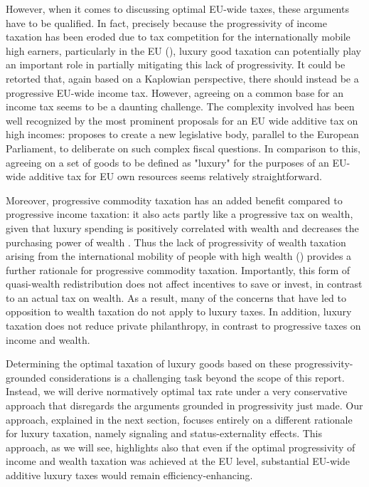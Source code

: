 \documentclass[../../main]{subfiles}
\begin{document}
However, when it comes to discussing optimal EU-wide taxes, these arguments have to be qualified. In fact, precisely because the progressivity of income taxation has been eroded due to tax competition for the internationally mobile high earners, particularly in the EU (\citet{kleven2011taxation}), luxury good taxation can potentially play an important role in partially mitigating this lack of progressivity. It could be retorted that, again based on a Kaplowian perspective, there should instead be a progressive EU-wide income tax. However, agreeing on a common base for an income tax seems to be a daunting challenge. The complexity involved has been well recognized by the most prominent proposals for an EU wide additive tax on high incomes: \citet{hennette2019democratize} proposes to create a new legislative body, parallel to the European Parliament, to deliberate on such complex fiscal questions. In comparison to this, agreeing on a set of goods to be defined as "luxury" for the purposes of an EU-wide additive tax for EU own resources seems relatively straightforward. 

Moreover, progressive commodity taxation has an added benefit compared to progressive income taxation: it also acts partly like a progressive tax on wealth, given that luxury spending is positively correlated with wealth and decreases the purchasing power of wealth \citet{kaplow2008theory}.
Thus the lack of progressivity of wealth taxation arising from the international mobility of people with high wealth (\cite{agrawal2025wealth}) provides a further rationale for progressive commodity taxation. Importantly, this form of quasi-wealth redistribution does not affect incentives to save or invest, in contrast to an actual tax on wealth. As a result, many of the concerns that have led to opposition to wealth taxation %
do not apply to luxury taxes. In addition, luxury taxation does not reduce private philanthropy, in contrast to progressive taxes on income and wealth.

Determining the optimal taxation of luxury goods based on these progressivity-grounded considerations is a challenging task beyond the scope of this report. Instead, we will derive normatively optimal tax rate under a very conservative approach %
that disregards the arguments grounded in progressivity just made. Our approach, explained in the next section, focuses entirely on a different rationale for luxury taxation, namely signaling and status-externality effects. This approach, as we will see, highlights also that even if the optimal progressivity of income and wealth taxation was achieved at the EU level, substantial EU-wide additive luxury taxes would remain efficiency-enhancing. 
\end{document}
